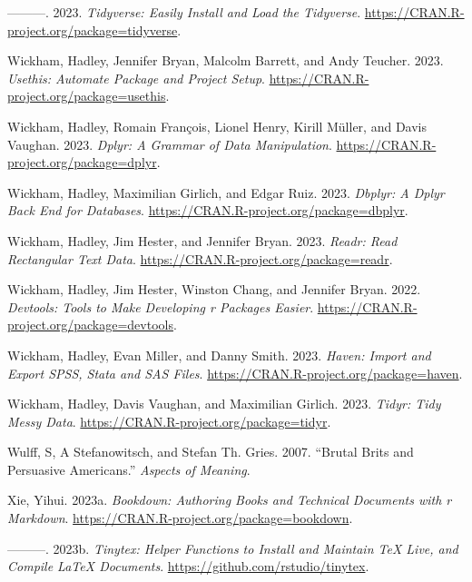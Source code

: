 \documentclass[
  letterpaper,
  DIV=11,
  numbers=noendperiod]{scrreport}
\newlength{\cslhangindent}
\newlength{\cslentryspacingunit} %
\newenvironment{CSLReferences}[2] %
 {%
  \setlength{\parindent}{0pt}
  \ifodd #1
  \let\oldpar\par
  \def\par{\hangindent=\cslhangindent\oldpar}
  \fi
  \setlength{\parskip}{#2\cslentryspacingunit}
 }%
 {}
\theoremstyle{definition}
\theoremstyle{remark}
\begin{document}
\begin{CSLReferences}{1}{0}
\leavevmode{}%
---------. 2023. \emph{Tidyverse: Easily Install and Load the
Tidyverse}. \url{https://CRAN.R-project.org/package=tidyverse}.

\leavevmode{}%
Wickham, Hadley, Jennifer Bryan, Malcolm Barrett, and Andy Teucher.
2023. \emph{Usethis: Automate Package and Project Setup}.
\url{https://CRAN.R-project.org/package=usethis}.

\leavevmode{}%
Wickham, Hadley, Romain François, Lionel Henry, Kirill Müller, and Davis
Vaughan. 2023. \emph{Dplyr: A Grammar of Data Manipulation}.
\url{https://CRAN.R-project.org/package=dplyr}.

\leavevmode{}%
Wickham, Hadley, Maximilian Girlich, and Edgar Ruiz. 2023. \emph{Dbplyr:
A Dplyr Back End for Databases}.
\url{https://CRAN.R-project.org/package=dbplyr}.

\leavevmode{}%
Wickham, Hadley, Jim Hester, and Jennifer Bryan. 2023. \emph{Readr: Read
Rectangular Text Data}. \url{https://CRAN.R-project.org/package=readr}.

\leavevmode{}%
Wickham, Hadley, Jim Hester, Winston Chang, and Jennifer Bryan. 2022.
\emph{Devtools: Tools to Make Developing r Packages Easier}.
\url{https://CRAN.R-project.org/package=devtools}.

\leavevmode{}%
Wickham, Hadley, Evan Miller, and Danny Smith. 2023. \emph{Haven: Import
and Export SPSS, Stata and SAS Files}.
\url{https://CRAN.R-project.org/package=haven}.

\leavevmode{}%
Wickham, Hadley, Davis Vaughan, and Maximilian Girlich. 2023.
\emph{Tidyr: Tidy Messy Data}.
\url{https://CRAN.R-project.org/package=tidyr}.

\leavevmode{}%
Wulff, S, A Stefanowitsch, and Stefan Th. Gries. 2007. {``Brutal Brits
and Persuasive Americans.''} \emph{Aspects of Meaning}.

\leavevmode{}%
Xie, Yihui. 2023a. \emph{Bookdown: Authoring Books and Technical
Documents with r Markdown}.
\url{https://CRAN.R-project.org/package=bookdown}.

\leavevmode{}%
---------. 2023b. \emph{Tinytex: Helper Functions to Install and
Maintain TeX Live, and Compile LaTeX Documents}.
\url{https://github.com/rstudio/tinytex}.

\end{CSLReferences}
\end{document}
